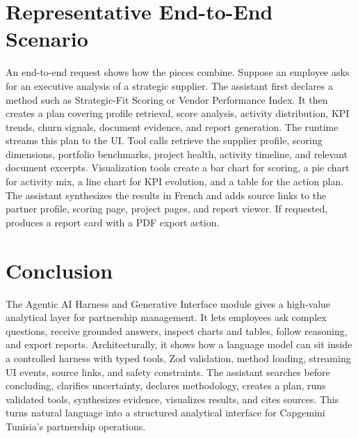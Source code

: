 \section{Representative End-to-End Scenario}
An end-to-end request shows how the pieces combine. Suppose an employee asks for an executive analysis of a strategic supplier. The assistant first declares a method such as Strategic-Fit Scoring or Vendor Performance Index. It then creates a plan covering profile retrieval, score analysis, activity distribution, KPI trends, churn signals, document evidence, and report generation. The runtime streams this plan to the UI. Tool calls retrieve the supplier profile, scoring dimensions, portfolio benchmarks, project health, activity timeline, and relevant document excerpts. Visualization tools create a bar chart for scoring, a pie chart for activity mix, a line chart for KPI evolution, and a table for the action plan. The assistant synthesizes the results in French and adds source links to the partner profile, scoring page, project pages, and report viewer. If requested,  produces a report card with a PDF export action.
\section{Conclusion}
The Agentic AI Harness and Generative Interface module gives \projectname{} a high-value analytical layer for partnership management. It lets employees ask complex questions, receive grounded answers, inspect charts and tables, follow reasoning, and export reports. Architecturally, it shows how a language model can sit inside a controlled harness with typed tools, Zod validation, method loading, streaming UI events, source links, and safety constraints. The assistant searches before concluding, clarifies uncertainty, declares methodology, creates a plan, runs validated tools, synthesizes evidence, visualizes results, and cites sources. This turns natural language into a structured analytical interface for Capgemini Tunisia's partnership operations.
